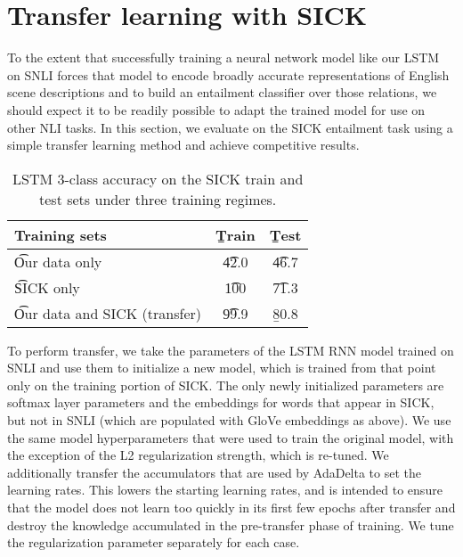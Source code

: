 \section{Transfer learning with SICK}

To the extent that successfully training a neural network model like our LSTM on SNLI forces that model to encode broadly accurate representations of English scene descriptions and to build an entailment classifier over those relations, we should expect it to be readily possible to adapt the trained model for use on other NLI tasks. In this section, we evaluate on the SICK entailment task using a simple transfer learning method and achieve competitive results.

\begin{table}
\begin{center}
\begin{tabular}{l@{\hskip \colspaceL}@{\hskip \colspaceL}c@{\hskip \colspaceL}c}
\toprule
\textbf{Training sets} & \b{Train}  & \b{Test}\\
\midrule
\t{Our data only}            & \t{42.0} & \t{46.7} \\
\t{SICK only}            & \t{100} & \t{71.3} \\
\t{Our data and SICK (transfer)}            & \t{99.9} & \b{80.8} \\
\bottomrule
\end{tabular}
\end{center}

\caption{\label{tab:transferresults}
LSTM 3-class accuracy on the SICK train and test sets under three training regimes.} 
\end{table}


To perform transfer, we take the parameters of the LSTM RNN model trained on SNLI and use them to initialize a new model, which is trained from that point only on the training portion of SICK. The only newly initialized parameters are softmax layer parameters and the embeddings for words that appear in SICK, but not in SNLI (which are populated with GloVe embeddings as above). We use the same model hyperparameters that were used to train the original model, with the exception of the L2 regularization strength, which is re-tuned. We additionally transfer the accumulators that are used by AdaDelta to set the learning rates. This lowers the starting learning rates, and is intended to ensure that the model does not learn too quickly in its first few epochs after transfer and destroy the knowledge accumulated in the pre-transfer phase of training. We tune the regularization parameter separately for each case. 

